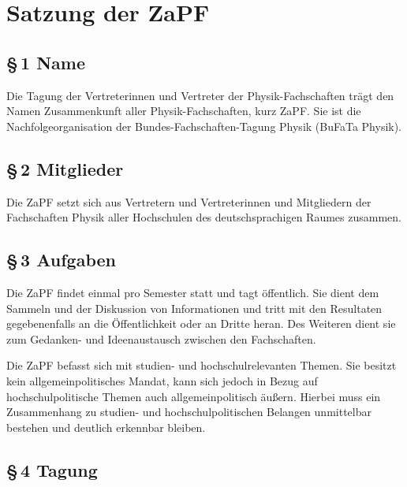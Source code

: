 

\section{Satzung der ZaPF}
\label{satzung}

\subsection*{§\,1 Name%
  \label{name}%
}

Die Tagung der Vertreterinnen und Vertreter der Physik-Fachschaften trägt den
Namen Zusammenkunft aller Physik-Fachschaften, kurz ZaPF.
Sie ist die Nachfolgeorganisation der Bundes-Fachschaften-Tagung Physik (BuFaTa Physik).


\subsection*{§\,2 Mitglieder%
  \label{mitglieder}%
}

Die ZaPF setzt sich aus Vertretern und Vertreterinnen und Mitgliedern der
Fachschaften Physik aller Hochschulen des deutschsprachigen Raumes zusammen.


\subsection*{§\,3 Aufgaben%
  \label{aufgaben}%
}

Die ZaPF findet einmal pro Semester statt und tagt öffentlich. Sie dient dem
Sammeln und der Diskussion von Informationen und tritt mit den Resultaten
gegebenenfalls an die Öffentlichkeit oder an Dritte heran.
Des Weiteren dient sie zum Gedanken- und Ideenaustausch zwischen den
Fachschaften.

Die ZaPF befasst sich mit studien- und hochschulrelevanten Themen. Sie besitzt
kein allgemeinpolitisches Mandat, kann sich jedoch in Bezug auf
hochschulpolitische Themen auch allgemeinpolitisch äußern. Hierbei muss ein
Zusammenhang zu studien- und hochschulpolitischen Belangen unmittelbar bestehen
und deutlich erkennbar bleiben.


\subsection*{§\,4 Tagung%
  \label{tagung}%
}

